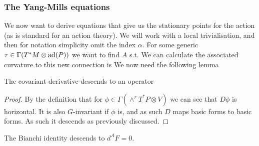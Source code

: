 \documentclass{article}
\begin{document}
\subsubsection{The Yang-Mills equations}

We now want to derive equations that give us the stationary points for the action (as is standard for an action theory). We will work with a local trivialisation, and then for notation simplicity omit the index $\alpha$. For some generic $\tau \in \Gamma(T^\ast M \otimes \operatorname{ad}(P))$ we want to find $A$ s.t.  
We can calculate the associated curvature to this new connection is 
We now need the following lemma
\begin{lemma}
	The covariant derivative descends to an operator 
\end{lemma}
\begin{proof}
	By the definition that for $\phi \in \Gamma(\wedge^r T^\ast P \otimes V)$ 
we can see that $D\phi$ is horizontal. It is also $G$-invariant if $\phi$ is, and as such $D$ maps basic forms to basic forms. As such it descends as previously discussed.
\end{proof}

\begin{corollary}
	The Bianchi identity descends to $d^A F = 0$. 
\end{corollary}
\end{document}

